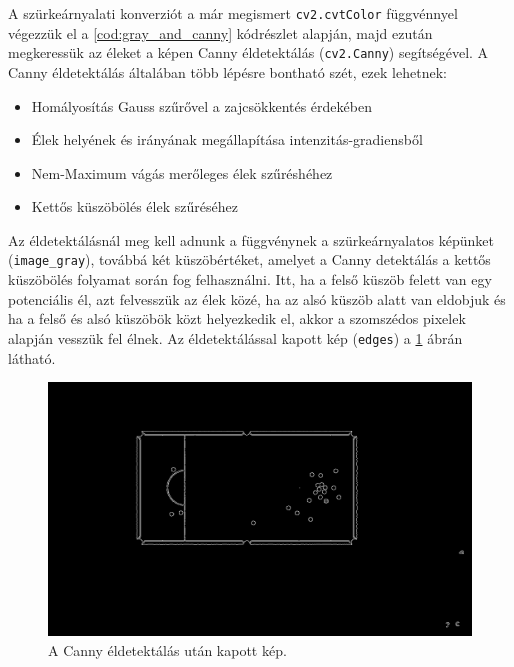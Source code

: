 \par A szürkeárnyalati konverziót a már megismert \lstinline{cv2.cvtColor} függvénnyel \cite{cv2_cvt_color} végezzük el a \ref{cod:gray_and_canny} kódrészlet alapján, majd ezután megkeressük az éleket a képen Canny éldetektálás \cite{cv2_canny,canny_edge_detection} (\lstinline{cv2.Canny}) segítségével.
\newline A Canny éldetektálás általában több lépésre bontható szét, ezek lehetnek:

\begin{itemize}
    \setlength\itemsep{-2pt}
    \item Homályosítás Gauss szűrővel \cite{shapiro2001} a zajcsökkentés érdekében
    \item Élek helyének és irányának megállapítása intenzitás-gradiensből
    \item Nem-Maximum vágás merőleges élek szűréshéhez
    \item Kettős küszöbölés élek szűréséhez
\end{itemize}

\par Az éldetektálásnál meg kell adnunk a függvénynek a szürkeárnyalatos képünket (\lstinline{image_gray}), továbbá két küszöbértéket, amelyet a Canny detektálás a kettős küszöbölés folyamat során fog felhasználni. Itt, ha a felső küszöb felett van egy potenciális él, azt felvesszük az élek közé, ha az alsó küszöb alatt van eldobjuk és ha a felső és alsó küszöbök közt helyezkedik el, akkor a szomszédos pixelek alapján vesszük fel élnek. Az éldetektálással kapott kép (\lstinline{edges}) a \ref{fig:bemeneti_kep_edge} ábrán látható.

\begin{figure}[!ht]
    \centering
    \includegraphics[width=150mm, keepaspectratio]{figures/input_screen_edge.png}
    \caption{A Canny éldetektálás után kapott kép.}
    \label{fig:bemeneti_kep_edge}
\end{figure}

